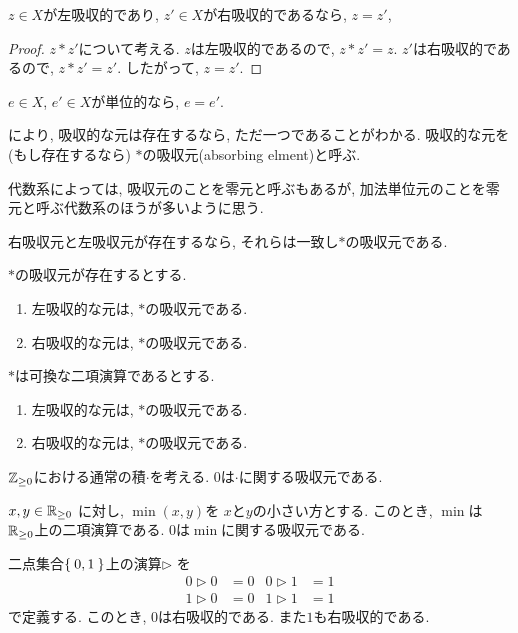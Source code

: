 \begin{lemma}
  $z\in X$が左吸収的であり,
  $z'\in X$が右吸収的であるなら,
  $z=z'$,
\end{lemma}
\begin{proof}
  $z\ast z'$について考える.
  $z$は左吸収的であるので, $z\ast z'=z$.
  $z'$は右吸収的であるので, $z\ast z'=z'$.
  したがって, $z=z'$.
\end{proof}
\begin{cor}
\label{cor:uniq:absorbinelm}
  $e\in X$, $e'\in X$が単位的なら,
  $e=e'$.
\end{cor}
\begin{remark}
  により,
  吸収的な元は存在するなら, ただ一つであることがわかる.
  吸収的な元を (もし存在するなら)
  $\ast$の吸収元(absorbing elment)と呼ぶ.

  代数系によっては, 吸収元のことを零元と呼ぶもあるが,
  加法単位元のことを零元と呼ぶ代数系のほうが多いように思う.
\end{remark}
\begin{cor}
  右吸収元と左吸収元が存在するなら,
  それらは一致し$\ast$の吸収元である.
\end{cor}
\begin{cor}
  $\ast$の吸収元が存在するとする.
  \begin{enumerate}
  \item 左吸収的な元は, $\ast$の吸収元である.
  \item 右吸収的な元は, $\ast$の吸収元である.
  \end{enumerate}
\end{cor}
\begin{cor}
  $\ast$は可換な二項演算であるとする.
  \begin{enumerate}
  \item 左吸収的な元は, $\ast$の吸収元である.
  \item 右吸収的な元は, $\ast$の吸収元である.
  \end{enumerate}
\end{cor}
\begin{example}
  $\mathbb{Z}_{\geq 0}$における通常の積$\cdot$を考える.
  $0$は$\cdot$に関する吸収元である.
\end{example}
\begin{example}
  $x,y\in\mathbb{R}_{\geq 0}$
  に対し, $\min(x,y)$を
  $x$と$y$の小さい方とする.
  このとき, $\min$は
  $\mathbb{R}_{\geq 0}$上の二項演算である.
  $0$は$\min$に関する吸収元である.
\end{example}

\begin{example}
  二点集合$\Set{0,1}$上の演算$\rhd$
  を
  \begin{align*}
    0\rhd 0 &= 0&
    0\rhd 1 &= 1\\
    1\rhd 0 &= 0&
    1\rhd 1 &= 1
  \end{align*}
  で定義する.
  このとき, $0$は右吸収的である.
  また$1$も右吸収的である.
\end{example}


